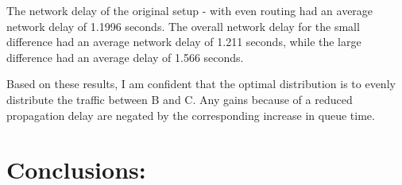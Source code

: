 \documentclass{article}
\begin{document}
The network delay of the original setup - with even routing had an average network delay of 1.1996 seconds.
The overall network delay for the small difference had an average network delay of 1.211 seconds, while the large difference had an average delay of 1.566 seconds.

Based on these results, I am confident that the optimal distribution is to evenly distribute the traffic between B and C.
Any gains because of a reduced propagation delay are negated by the corresponding increase in queue time.

\section{Conclusions:}
\label{sec:Conclusions}
\end{document}
